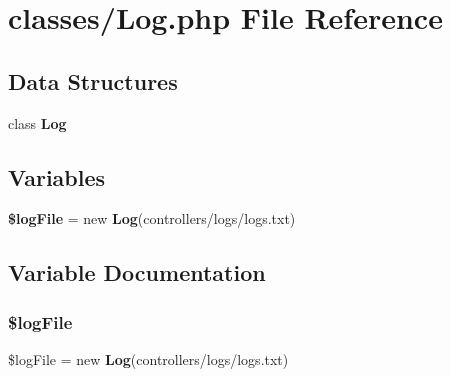 \section{classes/\+Log.php File Reference}
\label{_log_8php}
\subsection*{Data Structures}
\begin{DoxyCompactItemize}
\item 
class \textbf{ Log}
\end{DoxyCompactItemize}
\subsection*{Variables}
\begin{DoxyCompactItemize}
\item 
\textbf{ \$log\+File} = new \textbf{ Log}(\textquotesingle{}controllers/logs/logs.\+txt\textquotesingle{})
\end{DoxyCompactItemize}


\subsection{Variable Documentation}
\mbox{\label{_log_8php_ad82158894befeb1b9ff1e54dcd481e33}} 
\subsubsection{\$log\+File}
{\footnotesize\ttfamily \$log\+File = new \textbf{ Log}(\textquotesingle{}controllers/logs/logs.\+txt\textquotesingle{})}

